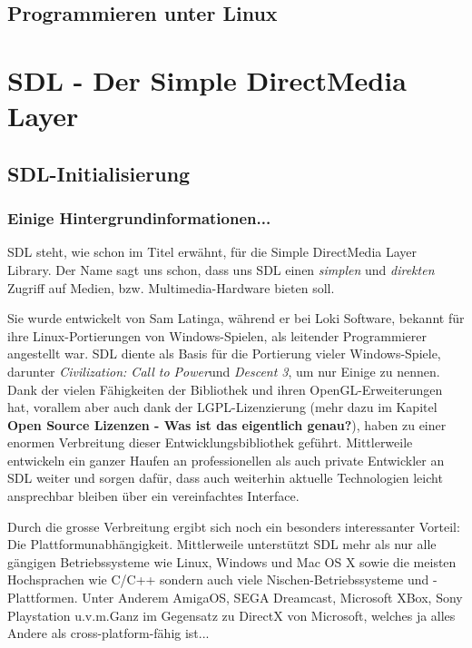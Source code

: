\documentclass[a4paper,10pt,dvips,fleqn,titlepage,twoside]{book}
\begin{document}
\chapter{Programmieren unter Linux}


\part{SDL - Der Simple DirectMedia Layer}
\label{part:SDL}
\chapter{SDL-Initialisierung}
\section{Einige Hintergrundinformationen...}
SDL steht, wie schon im Titel erw\"{a}hnt, f\"{u}r die Simple DirectMedia Layer Library. Der Name sagt uns schon, dass uns SDL einen \textit{simplen} und \textit{direkten} Zugriff auf Medien, bzw. Multimedia-Hardware bieten soll.

	Sie wurde entwickelt von Sam Latinga, w\"{a}hrend er bei Loki Software, bekannt f\"{u}r ihre Linux-Portierungen von Windows-Spielen, als leitender Programmierer angestellt war.
SDL diente als Basis f\"{u}r die Portierung vieler Windows-Spiele, darunter \emph{Civilization: Call to Power}und \emph{Descent 3}, um nur Einige zu nennen.\\
Dank der vielen F\"{a}higkeiten der Bibliothek und ihren OpenGL-Erweiterungen hat, vorallem aber auch dank der LGPL-Lizenzierung (mehr dazu im Kapitel \textbf{Open Source Lizenzen - Was ist das eigentlich genau?}), haben zu einer enormen Verbreitung dieser Entwicklungsbibliothek gef\"{u}hrt. Mittlerweile entwickeln ein ganzer Haufen an professionellen als auch private Entwickler an SDL weiter und sorgen daf\"{u}r, dass auch weiterhin aktuelle Technologien leicht ansprechbar bleiben \"{u}ber ein vereinfachtes Interface.

Durch die grosse Verbreitung ergibt sich noch ein besonders interessanter Vorteil: Die Plattformunabh\"{a}ngigkeit. Mittlerweile unterst\"{u}tzt SDL mehr als nur alle g\"{a}ngigen Betriebssysteme wie Linux, Windows und Mac OS X sowie die meisten Hochsprachen wie C/C++ sondern auch viele Nischen-Betriebssysteme und -Plattformen. Unter Anderem AmigaOS, SEGA Dreamcast, Microsoft XBox, Sony Playstation u.v.m.\newline Ganz im Gegensatz zu DirectX von Microsoft, welches ja alles Andere als cross-platform-f\"{a}hig ist...
\end{document}
